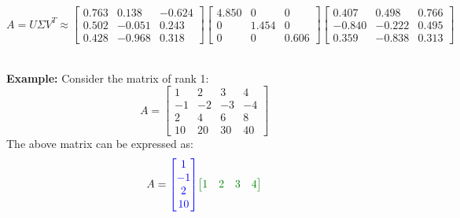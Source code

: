 \documentclass[DIV=20,oneside]{scrartcl}
\newcommand{\example}{
	\noindent\textbf{\\Example: }
}
\begin{document}
\begin{itemize}
	 $$A = U \Sigma V^T  \approx \begin{bmatrix} 0.763 & 0.138 & -0.624 \\ 0.502 & -0.051 & 0.243 \\ 0.428 & -0.968 & 0.318 \end{bmatrix} \begin{bmatrix} 4.850 & 0 & 0 \\ 0 & 1.454 & 0 \\ 0 & 0 & 0.606 \end{bmatrix} \begin{bmatrix} 0.407 & 0.498 & 0.766 \\ -0.840 & -0.222 & 0.495 \\ 0.359 & -0.838 & 0.313 \end{bmatrix}$$
	 
	 
	 \example  Consider the matrix of rank 1: $$A=\begin{bmatrix} 1 & 2 & 3 & 4 \\ -1 & -2 & -3 & -4 \\ 2 & 4 & 6 & 8 \\ 10 & 20 & 30 & 40 \end{bmatrix}$$
	 The above matrix can be expressed as:
	$$ A= {\color{blue}\begin{bmatrix} 1 \\ -1 \\ 2 \\ 10 \end{bmatrix}} {\color{green!50!black}\begin{bmatrix} 1 & 2 & 3 & 4 \end{bmatrix}}$$
	


\end{itemize}
\end{document}
